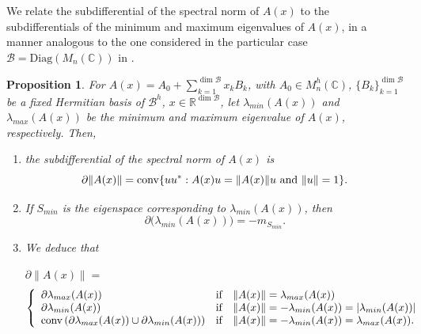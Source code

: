 \documentclass[12pt,a4paper]{article}
\def\calB{\mathcal B}
\def\R{\mathbb R}
\def\C{\mathbb C}
\newtheorem{proposition}{Proposition}
\numberwithin{equation}{section}
\begin{document}
We relate the subdifferential of the spectral norm of $A(x)$ to the subdifferentials of the minimum and maximum eigenvalues of $A(x)$, in a manner analogous to the one considered in the particular case $\mathcal{B}=\text{Diag}(M_n(\C))$ in \cite{BV-SDP}.

\begin{proposition} \label{eq subdif norma -eig matrix}
For $A(x)=A_0+\sum_{k=1}^{\dim{\calB}}x_kB_k$, with $A_0\in  M_n^{h}(\C)$, $\{B_k\}_{k=1}^{\dim{\calB}}$ be a fixed Hermitian basis of $\mathcal{B}^h$, $x\in \R^{\dim{\calB}}$, let $\lambda_{min}(A(x))$ and $\lambda_{max}(A(x))$ be the minimum and maximum eigenvalue of $A(x)$, respectively. Then,
\begin{enumerate}
	\item the subdifferential of the spectral norm of $A(x)$ is
		\begin{equation}\label{watsonhermit}
		\partial\|A(x)\|={\rm conv }\{uu^*: A(x)u=\|A(x)\|u \text{ and }\|u\|=1\}.
	\end{equation}
	\item If $S_{min}$ is the eigenspace corresponding to $\lambda_{min}(A(x))$, then
	\begin{equation}\label{subdiff min = momento}
		\partial\big(\lambda_{min}(A(x))\big)= -m_{S_{min}}.
	\end{equation}	
	\item We deduce that
	
	$\partial\|A(x)\|=$
	\begin{equation}
			\left\lbrace \begin{array}{lll}
				\partial\lambda_{max}(A(x))&\text{if}& \|A(x)\|=\lambda_{max}(A(x))\\
				\partial\lambda_{min}(A(x))&\text{if}& \|A(x)\|=-\lambda_{min}(A(x))=|\lambda_{min}(A(x))|\\
				{\rm conv}\left(\partial \lambda_{max}(A(x))\cup\partial \lambda_{min}(A(x)) \right)&\text{if}& \|A(x)\|=-\lambda_{min}(A(x))=\lambda_{max}(A(x)).
			\end{array}\right. 
	\end{equation}
	
\end{enumerate}	
\end{proposition}
\end{document}

